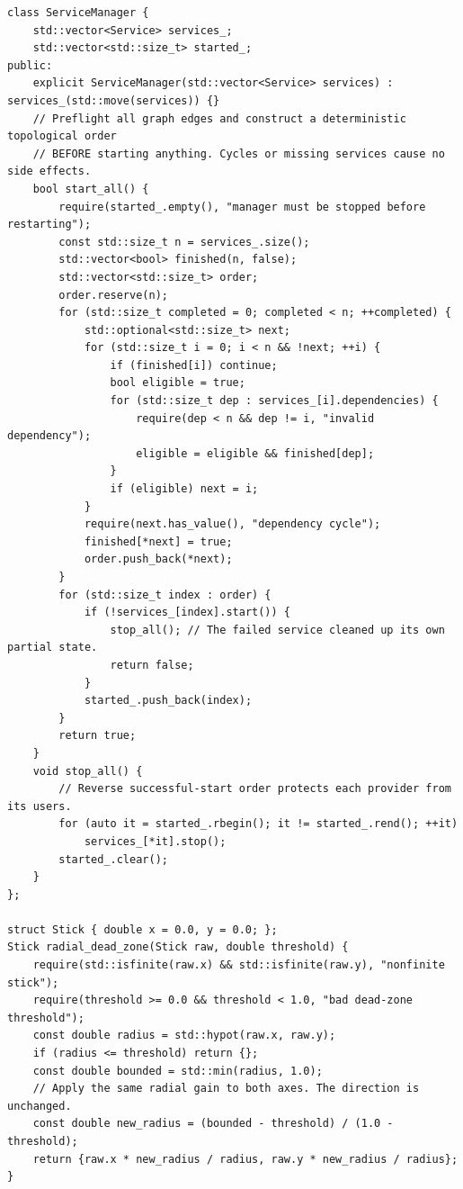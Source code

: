 \begin{verbatim}
class ServiceManager {
    std::vector<Service> services_;
    std::vector<std::size_t> started_;
public:
    explicit ServiceManager(std::vector<Service> services) : services_(std::move(services)) {}
    // Preflight all graph edges and construct a deterministic topological order
    // BEFORE starting anything. Cycles or missing services cause no side effects.
    bool start_all() {
        require(started_.empty(), "manager must be stopped before restarting");
        const std::size_t n = services_.size();
        std::vector<bool> finished(n, false);
        std::vector<std::size_t> order;
        order.reserve(n);
        for (std::size_t completed = 0; completed < n; ++completed) {
            std::optional<std::size_t> next;
            for (std::size_t i = 0; i < n && !next; ++i) {
                if (finished[i]) continue;
                bool eligible = true;
                for (std::size_t dep : services_[i].dependencies) {
                    require(dep < n && dep != i, "invalid dependency");
                    eligible = eligible && finished[dep];
                }
                if (eligible) next = i;
            }
            require(next.has_value(), "dependency cycle");
            finished[*next] = true;
            order.push_back(*next);
        }
        for (std::size_t index : order) {
            if (!services_[index].start()) {
                stop_all(); // The failed service cleaned up its own partial state.
                return false;
            }
            started_.push_back(index);
        }
        return true;
    }
    void stop_all() {
        // Reverse successful-start order protects each provider from its users.
        for (auto it = started_.rbegin(); it != started_.rend(); ++it)
            services_[*it].stop();
        started_.clear();
    }
};

struct Stick { double x = 0.0, y = 0.0; };
Stick radial_dead_zone(Stick raw, double threshold) {
    require(std::isfinite(raw.x) && std::isfinite(raw.y), "nonfinite stick");
    require(threshold >= 0.0 && threshold < 1.0, "bad dead-zone threshold");
    const double radius = std::hypot(raw.x, raw.y);
    if (radius <= threshold) return {};
    const double bounded = std::min(radius, 1.0);
    // Apply the same radial gain to both axes. The direction is unchanged.
    const double new_radius = (bounded - threshold) / (1.0 - threshold);
    return {raw.x * new_radius / radius, raw.y * new_radius / radius};
}


\end{verbatim}
